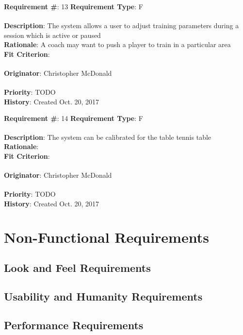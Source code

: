 \documentclass[11pt]{article}
\begin{document}
\begin{framed}
	\noindent\textbf{Requirement \#}: 13 \hfill \textbf{Requirement Type}: F \hfill\\\\
	\noindent\textbf{Description}: The system allows a user to adjust training parameters during a session which is active or paused \\
	\textbf{Rationale}: A coach may want to push a player to train in a particular area \\
	\textbf{Fit Criterion}:  \\\\
	\textbf{Originator}: Christopher McDonald \\\\
	\textbf{Priority}: TODO \hfill \\
	\noindent\textbf{History}: Created Oct. 20, 2017
\end{framed}

\begin{framed}
	\noindent\textbf{Requirement \#}: 14 \hfill \textbf{Requirement Type}: F \hfill\\\\
	\noindent\textbf{Description}: The system can be calibrated for the table tennis table \\
	\textbf{Rationale}: \\
	\textbf{Fit Criterion}: \\\\
	\textbf{Originator}: Christopher McDonald \\\\
	\textbf{Priority}: TODO \hfill \\
	\noindent\textbf{History}: Created Oct. 20, 2017
\end{framed}

\section{Non-Functional Requirements}

\subsection{Look and Feel Requirements}

\subsection{Usability and Humanity Requirements}

\subsection{Performance Requirements}
\end{document}
